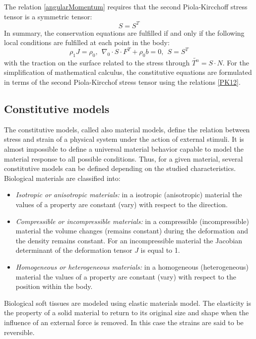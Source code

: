 The relation \ref{angularMomentum} requires that the second Piola-Kircchoff stress tensor is a symmetric tensor:
\begin{equation}
S = S^T
\end{equation}
In summary, the conservation equations are fulfilled if and only if the following local conditions are fulfilled at each point in the body:
\begin{equation}
\rho_1 J = \rho_0, \ \ \nabla_0 \cdot S \cdot F^T + \rho_0 b =0, \ \ S=S^T 
\end{equation}
with the traction on the surface related to the stress through $\tilde{T^n} = S \cdot N$.
 For the simplification of mathematical calculus, the constitutive equations are formulated in terms of the second Piola-Kircchof stress tensor using the relations \ref{PK12}.

\subsection{Constitutive models}\label{subsection:constitutivemodels}
   The constitutive models, called also material models, define the relation between stress and strain of a physical system under the action of external stimuli. It is almost impossible to define a universal material behavior capable to model the material response to all possible conditions. Thus, for a given material, several constitutive models can be defined depending on the studied characteristics. \\
	Biological materials are classified into:
	\begin{itemize}
\item \textit{ Isotropic or anisotropic materials:} in a isotropic (anisotropic) material the values of a property are constant (vary) with respect to the direction.

\item\textit{ Compressible or incompressible materials:} in a compressible (incompressible) material the volume changes (remains constant) during the deformation and the density remains constant. For an incompressible material the Jacobian determinant of the deformation tensor $J$ is equal to 1. 

\item \textit{Homogeneous or heterogeneous materials:} in a homogeneous (heterogeneous) material the values of a property are constant (vary) with respect to the position within the body.
	\end{itemize}

Biological soft tissues are modeled using elastic materials model. The elasticity is the property of a solid material to return to its original size and shape when the influence of an external force is removed. In this case the strains are said to be reversible. 
	 
